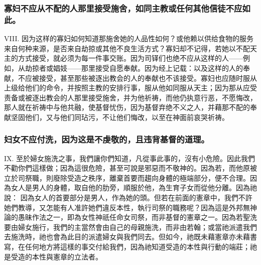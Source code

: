 
\subsubsection{寡妇不应从不配的人那里接受施舍，如同主教或任何其他信徒不应如此。}

VIII. 因为这样的寡妇如何知道那施舍她的人品性如何？或他赖以供给食物的服务来自何种来源，是否来自劫掠或其他不良生活方式？寡妇却不记得，若她以不配天主的方式接受，就必须为每一件事交账。因为司铎们也绝不应从这样的人——例如，从劫掠者或娼妓——那里接受自愿奉献。因为经上记载：以及这样的人的奉献，不应被接受，甚至那些被逐出教会的人的奉献也不该接受。寡妇也应随时服从上级给他们的命令，并按照主教的安排行事，服从他如同服从天主；因为那从应受责备或被逐出教会的人那里接受施舍，并为他祈祷，而他仍执意行恶，不愿悔改，那人就在祈祷中与他共融，使基督忧伤，因为基督弃绝不义之人，并藉那不配的奉献坚固他们，又与他们同玷污，不让他们悔改，以至在神面前哀哭祈祷。\par


\subsubsection{妇女不应付洗，因为这是不虔敬的，且违背基督的道理。}

IX. 至於婦女施洗之事，我們讓你們知道，凡從事此事的，沒有小危險。因此我們不勸你們這樣做；因為這很危險，甚至可說是邪惡而不敬神的。因為若，而他原被立於司祭職，則廢除受造之秩序，離棄首要而趨向身體的極端部分，便不合理。因為女人是男人的身體，取自他的肋旁，順服於他，為生育子女而從他分離。因為祂說： 因為女人的首要部分是男人，作為她的頭。但若在前面的憲章中，我們不許她們教導，又怎能有人准許她們違反本性，執行司祭的職務呢？因為這是外邦無神論的愚昧作法之一，即為女性神祇任命女司祭，而非基督的憲章之一。因為若聖洗要由婦女施行，我們的主當然會由自己的母親施洗，而非由若翰；或當祂派遣我們去施洗時，祂也會為此目的派遣婦女與我們同去。但如今，祂既未藉憲章亦未藉書寫，在任何地方將這樣的事交付給我們，因為祂知道受造的本性與行動的端莊；祂是受造的本性與憲章的立法者。\par


